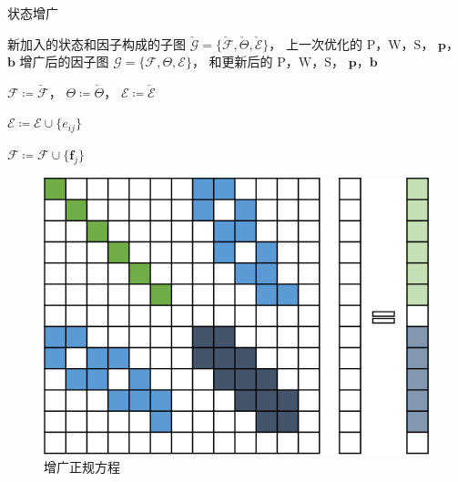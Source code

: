 \begin{algorithm}
\caption{状态增广}
\begin{algorithmic}
    \Require 新加入的状态和因子构成的子图
             $\check{\mathcal{G}}=\{\check{\mathcal{F}},\check{\Theta},\check{\mathcal{E}}\}$，
             上一次优化的
             $\mathrm{P}$，$\mathrm{W}$，$\mathrm{S}$，
             $\bm{p}$，$\bm{b}$
    \Ensure 增广后的因子图
            $\mathcal{G}=\{\mathcal{F},\Theta,\mathcal{E}\}$，
            和更新后的
            $\mathrm{P}$，$\mathrm{W}$，$\mathrm{S}$，
            $\bm{p}$，$\bm{b}$

    \State $\mathcal{F}\coloneqq\check{\mathcal{F}}$，
           $\Theta\coloneqq\check{\Theta}$，
           $\mathcal{E}\coloneqq\check{\mathcal{E}}$

        \State $\mathcal{E} \coloneqq \mathcal{E} \cup \{e_{ij}\}$

        \State $\mathcal{F} \coloneqq \mathcal{F} \cup \{\bm{f}_j\}$
    \EndFor

\end{algorithmic}
\label{alg:factor_graph_aug}
\end{algorithm}

\begin{figure}[htb!]
    \centering
    \includegraphics{figs/normal_eq_aug.png}
    \caption{增广正规方程}
\end{figure}


